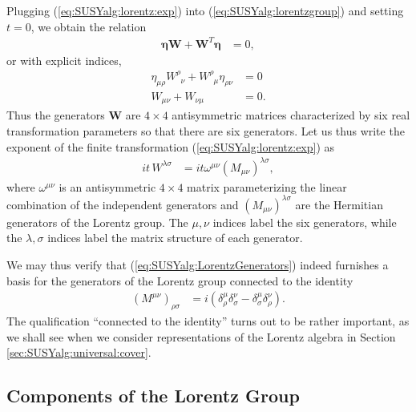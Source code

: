 \documentclass[12pt]{article}
\numberwithin{equation}{section}    %
\begin{document}
Plugging (\ref{eq:SUSYalg:lorentz:exp}) into  (\ref{eq:SUSYalg:lorentzgroup}) and setting $t=0$, we obtain the relation
\begin{align}
	\mathbf{\eta} \mathbf{W} + \mathbf{W}^T \mathbf{\eta} &= 0,
\end{align}
or with explicit indices,
\begin{align}
	\eta_{\mu\rho}W^\rho_{\phantom\rho\nu} + W^\rho_{\phantom\rho\mu}\eta_{\rho\nu} &=0\\
	W_{\mu\nu} + W_{\nu\mu} &= 0.
\end{align}
Thus the generators $\mathbf{W}$ are $4\times 4$ antisymmetric matrices characterized by six real transformation parameters so that there are six generators. Let us thus write the exponent of the finite transformation (\ref{eq:SUSYalg:lorentz:exp}) as
\begin{align}
	it\,W^{\lambda\sigma} &= i t\omega^{\mu\nu}\left(M_{\mu\nu}\right)^{\lambda\sigma},
\end{align}
where $\omega^{\mu\nu}$ is an antisymmetric $4 \times 4$ matrix parameterizing the linear combination of the independent generators and $\left(M_{\mu\nu}\right)^{\lambda\sigma}$ are the Hermitian generators of the Lorentz group. The $\mu,\nu$ indices label the six generators, while the $\lambda,\sigma$ indices label the matrix structure of each generator.

We may thus verify that  (\ref{eq:SUSYalg:LorentzGenerators}) indeed furnishes a basis for the generators of the Lorentz group connected to the identity
\begin{align}
(M^{\mu\nu})_{\rho\sigma}&=i(\delta^\mu_\rho\delta^\nu_\sigma-\delta^\mu_\sigma\delta^\nu_\rho).
\end{align}
The qualification ``connected to the identity'' turns out to be rather important, as we shall see when we consider representations of the Lorentz algebra in Section \ref{sec:SUSYalg:universal:cover}.

\subsection{Components of the Lorentz Group}
\end{document}
